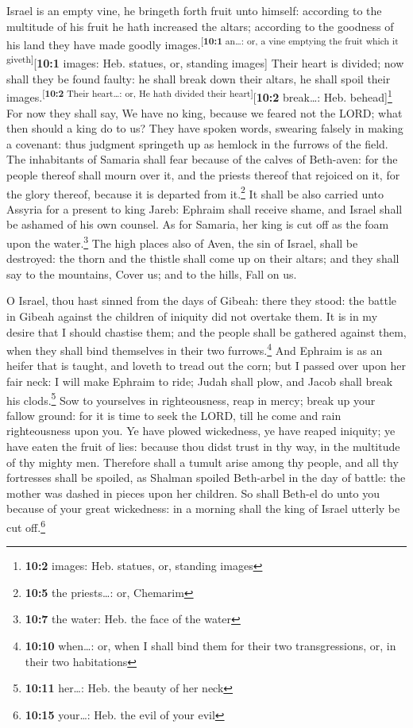  Israel is an empty vine, he bringeth forth fruit unto
himself: according to the multitude of his fruit he hath increased the
altars; according to the goodness of his land they have made goodly
images.\textsuperscript{{[}\textbf{10:1} an\ldots: or, a vine emptying
the fruit which it giveth{]}}{[}\textbf{10:1} images: Heb. statues, or,
standing images{]}  Their heart is divided; now shall they
be found faulty: he shall break down their altars, he shall spoil their
images.\textsuperscript{{[}\textbf{10:2} Their heart\ldots: or, He hath
divided their heart{]}}{[}\textbf{10:2} break\ldots: Heb.
behead{]}\footnote{\textbf{10:2} images: Heb. statues, or, standing
  images}  For now they shall say, We have no king,
because we feared not the LORD; what then should a king do to us?
 They have spoken words, swearing falsely in making a
covenant: thus judgment springeth up as hemlock in the furrows of the
field.  The inhabitants of Samaria shall fear because of
the calves of Beth-aven: for the people thereof shall mourn over it, and
the priests thereof that rejoiced on it, for the glory thereof, because
it is departed from it.\footnote{\textbf{10:5} the priests\ldots: or,
  Chemarim}  It shall be also carried unto Assyria for a
present to king Jareb: Ephraim shall receive shame, and Israel shall be
ashamed of his own counsel.  As for Samaria, her king is
cut off as the foam upon the water.\footnote{\textbf{10:7} the water:
  Heb. the face of the water}  The high places also of
Aven, the sin of Israel, shall be destroyed: the thorn and the thistle
shall come up on their altars; and they shall say to the mountains,
Cover us; and to the hills, Fall on us.

 O Israel, thou hast sinned from the days of Gibeah: there
they stood: the battle in Gibeah against the children of iniquity did
not overtake them.  It is in my desire that I should
chastise them; and the people shall be gathered against them, when they
shall bind themselves in their two furrows.\footnote{\textbf{10:10}
  when\ldots: or, when I shall bind them for their two transgressions,
  or, in their two habitations}  And Ephraim is as an
heifer that is taught, and loveth to tread out the corn; but I passed
over upon her fair neck: I will make Ephraim to ride; Judah shall plow,
and Jacob shall break his clods.\footnote{\textbf{10:11} her\ldots: Heb.
  the beauty of her neck}  Sow to yourselves in
righteousness, reap in mercy; break up your fallow ground: for it is
time to seek the LORD, till he come and rain righteousness upon you.
 Ye have plowed wickedness, ye have reaped iniquity; ye
have eaten the fruit of lies: because thou didst trust in thy way, in
the multitude of thy mighty men.  Therefore shall a
tumult arise among thy people, and all thy fortresses shall be spoiled,
as Shalman spoiled Beth-arbel in the day of battle: the mother was
dashed in pieces upon her children.  So shall Beth-el do
unto you because of your great wickedness: in a morning shall the king
of Israel utterly be cut off.\footnote{\textbf{10:15} your\ldots: Heb.
  the evil of your evil}

